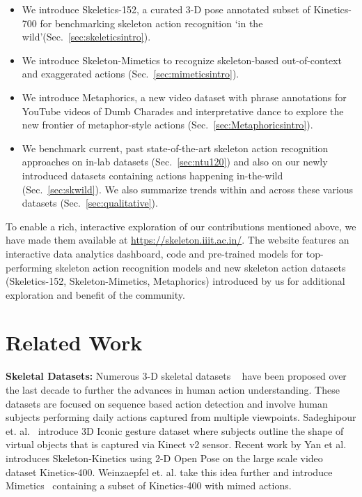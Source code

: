 \documentclass[twocolumn]{svjour3}          \smartqed  \usepackage{graphicx}
\begin{document}
\begin{itemize}
    \item We introduce Skeletics-152, a curated 3-D pose annotated subset of Kinetics-700 for benchmarking skeleton action recognition `in the wild'(Sec.~\ref{sec:skeleticsintro}).
    \item We introduce Skeleton-Mimetics to recognize skeleton-based out-of-context and exaggerated actions  (Sec.~\ref{sec:mimeticsintro}).
    \item We introduce Metaphorics, a new video dataset with phrase annotations for YouTube videos of Dumb Charades and interpretative dance to explore the new frontier of metaphor-style actions (Sec.~\ref{sec:Metaphoricsintro}).
    \item We benchmark current, past state-of-the-art skeleton action recognition approaches on in-lab datasets (Sec.~\ref{sec:ntu120}) and also on our newly introduced datasets containing actions happening in-the-wild (Sec.~\ref{sec:skwild}). We also summarize trends within and across these various datasets (Sec.~\ref{sec:qualitative}).
\end{itemize}

To enable a rich, interactive exploration of our contributions mentioned above, we have made them available at \url{https://skeleton.iiit.ac.in/}. The website features an interactive data analytics dashboard, code and pre-trained models for top-performing skeleton action recognition models and
new skeleton action datasets (Skeletics-152, Skeleton-Mimetics, Metaphorics) introduced by us for additional exploration and benefit of the community.


\section{Related Work}

\noindent \textbf{Skeletal Datasets:} Numerous 3-D skeletal datasets ~\cite{cg-2007-2,Liu_2019_NTURGBD120,Shahroudy_2016_CVPR,liu2017pku,seidenari2013recognizing,li2010action} have been proposed over the last decade to further the advances in human action understanding. These datasets are focused on sequence based action detection and involve human subjects performing daily actions captured from multiple viewpoints. Sadeghipour et. al.~\cite{3DICONIC} introduce 3D Iconic gesture dataset where subjects outline the shape of virtual objects that is captured via Kinect v2 sensor. Recent work by Yan et al.~\cite{stgcn2018aaai} introduces Skeleton-Kinetics using 2-D Open Pose on the large scale video dataset Kinetics-400. Weinzaepfel et. al. take this idea further and introduce Mimetics~\cite{weinzaepfel2019mimetics} containing a subset of Kinetics-400 with mimed actions. 
\end{document}
